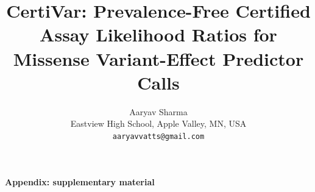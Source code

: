 \documentclass[10pt,letterpaper]{article}
\title{\vspace{-2.3em}CertiVar: Prevalence-Free Certified Assay Likelihood Ratios for Missense Variant-Effect
Predictor Calls}
\author{Aaryav Sharma\\Eastview High School, Apple Valley, MN, USA\\\texttt{aaryavvatts@gmail.com}}
\date{\vspace{-2em}}
\begin{document}
\maketitle












\clearpage
\appendix
\setcounter{table}{0}
\setcounter{figure}{0}
\setcounter{equation}{0}
\renewcommand{\thesection}{S\arabic{section}}
\renewcommand{\thetable}{S\arabic{table}}
\renewcommand{\thefigure}{S\arabic{figure}}
\renewcommand{\theequation}{S\arabic{equation}}
\begin{center}\Large\bfseries Appendix: supplementary material\end{center}

\end{document}

